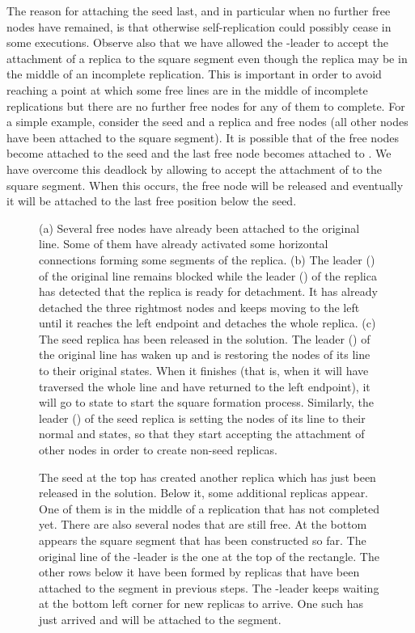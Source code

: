 \documentclass[oribibl, 11pt]{llncs}
\begin{document}
The reason for attaching the seed last, and in particular when no further free nodes have remained, is that otherwise self-replication could possibly cease in some executions. Observe also that we have allowed the -leader to accept the attachment of a replica to the square segment even though the replica may be in the middle of an incomplete replication. This is important in order to avoid reaching a point at which some free lines are in the middle of incomplete replications but there are no further free nodes for any of them to complete. For a simple example, consider the seed and a replica  and  free nodes (all other nodes have been attached to the square segment). It is possible that  of the free nodes become attached to the seed and the last free node becomes attached to . We have overcome this deadlock by allowing  to accept the attachment of  to the square segment. When this occurs, the free node will be released and eventually it will be attached to the last free position below the seed.



\begin{figure}[!hbtp]
\caption{(a) Several free nodes have already been attached to the original line. Some of them have already activated some horizontal connections forming some segments of the replica. (b) The leader () of the original line remains blocked while the leader () of the replica has detected that the replica is ready for detachment. It has already detached the three rightmost nodes and keeps moving to the left until it reaches the left endpoint and detaches the whole replica. (c) The seed replica has been released in the solution. The leader () of the original line has waken up and is restoring the nodes of its line to their original states. When it finishes (that is, when it will have traversed the whole line and have returned to the left endpoint), it will go to state  to start the square formation process. Similarly, the leader () of the seed replica is setting the nodes of its line to their normal  and  states, so that they start accepting the attachment of other nodes in order to create non-seed replicas.} \label{fig:square-terminating1}
\end{figure}

\begin{figure}[!hbtp]
\caption{The seed at the top has created another replica which has just been released in the solution. Below it, some additional replicas appear. One of them is in the middle of a replication that has not completed yet. There are also several nodes that are still free. At the bottom appears the square segment that has been constructed so far. The original line of the -leader is the one at the top of the rectangle. The other rows below it have been formed by replicas that have been attached to the segment in previous steps. The -leader keeps waiting at the bottom left corner for new replicas to arrive. One such has just arrived and will be attached to the segment.} \label{fig:square-terminating2}
\end{figure}
\end{document}
